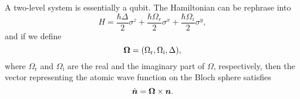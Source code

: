 \documentclass[hyperref, a4paper]{article}
\begin{document}
A two-level system is essentially a qubit. The Hamiltonian can be rephrase into 
\begin{equation}
    H = \frac{\hbar \Delta}{2} \sigma^z + \frac{\hbar \Omega_r}{2} \sigma^x + \frac{\hbar \Omega_i}{2} \sigma^y, 
\end{equation}
and if we define 
\begin{equation}
    \vb*{\Omega} = (\Omega_\text{r}, \Omega_\text{i}, \Delta),
\end{equation}
where $\Omega_\text{r}$ and $\Omega_\text{i}$ are the real and the imaginary part of $\Omega$, respectively, 
then the vector representing the atomic wave function on the Bloch sphere satisfies 
\begin{equation}
    \dot{\vb*{n}} = \vb*{\Omega} \times \vb*{n}.
\end{equation}
\end{document}

